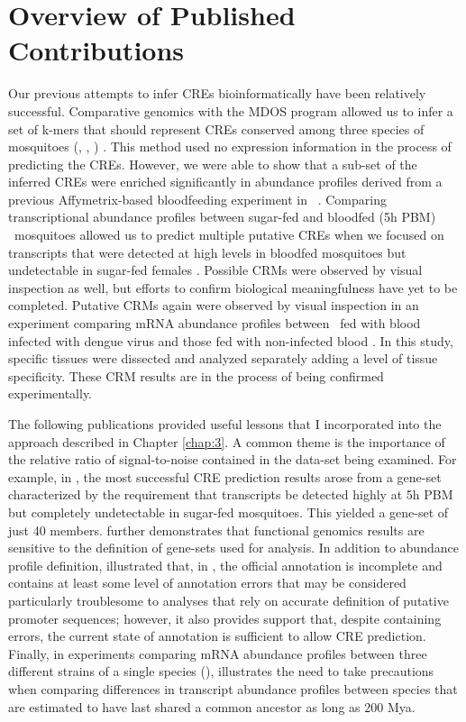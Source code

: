 \chapter{Overview of Published Contributions}


Our previous attempts to infer \glspl{CRE} bioinformatically have been relatively successful.
Comparative genomics with the \gls{MDOS} program allowed us to infer a set of k-mers that should represent \glspl{CRE} conserved among three species of mosquitoes (\Aa, \Ag, \Cq) \cite{Sieglaff2009}.
This method used no expression information in the process of predicting the \glspl{CRE}.
However, we were able to show that a sub-set of the inferred \glspl{CRE} were enriched significantly in abundance profiles derived from a previous Affymetrix-based bloodfeeding experiment in \Ag\ \cite{Marinotti2005,Marinotti2006}.
Comparing transcriptional abundance profiles between sugar-fed and bloodfed (5h \gls{PBM}) \Aa\ mosquitoes allowed us to predict multiple putative \glspl{CRE} when we focused on transcripts that were detected at high levels in bloodfed mosquitoes but undetectable in sugar-fed females \cite{Bonizzoni2011}.
Possible \glspl{CRM} were observed by visual inspection as well, but efforts to confirm biological meaningfulness have yet to be completed.
Putative \glspl{CRM} again were observed by visual inspection in an experiment comparing mRNA abundance profiles between \Aa\ fed with blood infected with dengue virus and those fed with non-infected blood \cite{bonizzoni2012complex}.
In this study, specific tissues were dissected and analyzed separately adding a level of tissue specificity.
These \gls{CRM} results are in the process of being confirmed experimentally.

The following publications provided useful lessons that I incorporated into the approach described in Chapter \ref{chap:3}.
A common theme is the importance of the relative ratio of signal-to-noise contained in the data-set being examined.
For example, in \citet{Bonizzoni2011}, the most successful \gls{CRE} prediction results arose from a gene-set characterized by the requirement that transcripts be detected highly at 5h \gls{PBM} but completely undetectable in sugar-fed mosquitoes.
This yielded a gene-set of just 40 members.
\citet{bonizzoni2012complex} further demonstrates that \gls{functional genomics} results are sensitive to the definition of gene-sets used for analysis.
In addition to abundance profile definition, \citet{Bonizzoni2011} illustrated that, in \Aa, the official annotation is incomplete and contains at least some level of annotation errors that may be considered particularly troublesome to analyses that rely on accurate definition of putative promoter sequences; however, it also provides support that, despite containing errors, the current state of annotation is sufficient to allow \gls{CRE} prediction.
Finally, in experiments comparing mRNA abundance profiles between three different strains of a single species (\Aa), \citet{bonizzoni2012strain} illustrates the need to take precautions when comparing differences in transcript abundance profiles between species that are estimated to have last shared a common ancestor as long as 200 \gls{Mya}.


